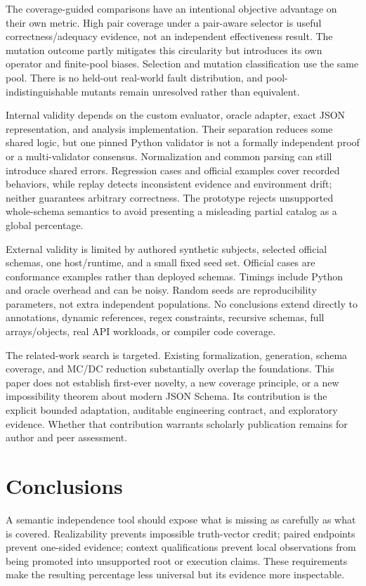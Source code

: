 \documentclass[sigconf,nonacm]{acmart}
\begin{document}
The coverage-guided comparisons have an intentional objective advantage on their own metric. High pair coverage under a pair-aware selector is useful correctness/adequacy evidence, not an independent effectiveness result. The mutation outcome partly mitigates this circularity but introduces its own operator and finite-pool biases. Selection and mutation classification use the same pool. There is no held-out real-world fault distribution, and pool-indistinguishable mutants remain unresolved rather than equivalent.

Internal validity depends on the custom evaluator, oracle adapter, exact JSON representation, and analysis implementation. Their separation reduces some shared logic, but one pinned Python validator is not a formally independent proof or a multi-validator consensus. Normalization and common parsing can still introduce shared errors. Regression cases and official examples cover recorded behaviors, while replay detects inconsistent evidence and environment drift; neither guarantees arbitrary correctness. The prototype rejects unsupported whole-schema semantics to avoid presenting a misleading partial catalog as a global percentage.

External validity is limited by authored synthetic subjects, selected official schemas, one host/runtime, and a small fixed seed set. Official cases are conformance examples rather than deployed schemas. Timings include Python and oracle overhead and can be noisy. Random seeds are reproducibility parameters, not extra independent populations. No conclusions extend directly to annotations, dynamic references, regex constraints, recursive schemas, full arrays/objects, real API workloads, or compiler code coverage.

The related-work search is targeted. Existing formalization, generation, schema coverage, and MC/DC reduction substantially overlap the foundations. This paper does not establish first-ever novelty, a new coverage principle, or a new impossibility theorem about modern JSON Schema. Its contribution is the explicit bounded adaptation, auditable engineering contract, and exploratory evidence. Whether that contribution warrants scholarly publication remains for author and peer assessment.

\section{Conclusions}
A semantic independence tool should expose what is missing as carefully as what is covered. Realizability prevents impossible truth-vector credit; paired endpoints prevent one-sided evidence; context qualifications prevent local observations from being promoted into unsupported root or execution claims. These requirements make the resulting percentage less universal but its evidence more inspectable.
\end{document}
